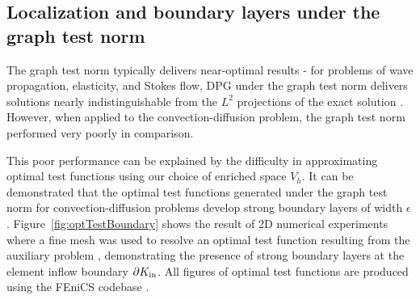 %

\subsection{Localization and boundary layers under the graph test norm}

The graph test norm typically delivers near-optimal results - for problems of wave propagation, elasticity, and Stokes flow, DPG under the graph test norm delivers solutions nearly indistinguishable from the $L^2$ projections of the exact solution \cite{DPG4, DPGElas, stokesDPG}.  However, when applied to the convection-diffusion problem, the graph test norm performed very poorly in comparison.

This poor performance can be explained by the difficulty in approximating optimal test functions using our choice of enriched space $V_h$.  It can be demonstrated that the optimal test functions generated under the graph test norm for convection-diffusion problems develop strong boundary layers of width $\epsilon$.  Figure~\ref{fig:optTestBoundary} shows the result of 2D numerical experiments where a fine mesh was used to resolve an optimal test function resulting from the auxiliary problem , demonstrating the presence of strong boundary layers at the element inflow boundary $\partial K_{\rm in}$.  All figures of optimal test functions are produced using the FEniCS codebase \cite{LoggMardalEtAl2012a}.

